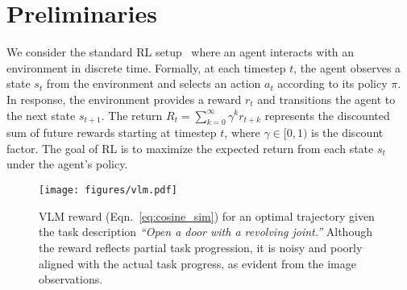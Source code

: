 \section{Preliminaries} \label{sec:background}

We consider the standard RL setup~\cite{sutton2018reinforcement} where an agent interacts with an environment in discrete time. Formally, at each timestep $t$, the agent observes a state $s_t$ from the environment and selects an action $a_t$ according to its policy $\pi$. In response, the environment provides a reward $r_t$ and transitions the agent to the next state $s_{t+1}$. The return $R_t = \sum_{k=0}^\infty \gamma^k r_{t+k}$ represents the discounted sum of future rewards starting at timestep $t$, where $\gamma \in [0, 1)$ is the discount factor. The goal of RL is to maximize the expected return from each state $s_t$ under the agent's policy.

\begin{figure}[!t]
    \centering
    \texttt{[image: figures/vlm.pdf]}
    \caption{VLM reward (Eqn.~\ref{eq:cosine_sim}) for an optimal trajectory given the task description \textit{``Open a door with a revolving joint.''} Although the reward reflects partial task progression, it is noisy and poorly aligned with the actual task progress, as evident from the image observations. 
    }
    \label{fig:noisy_reward}
\end{figure}
